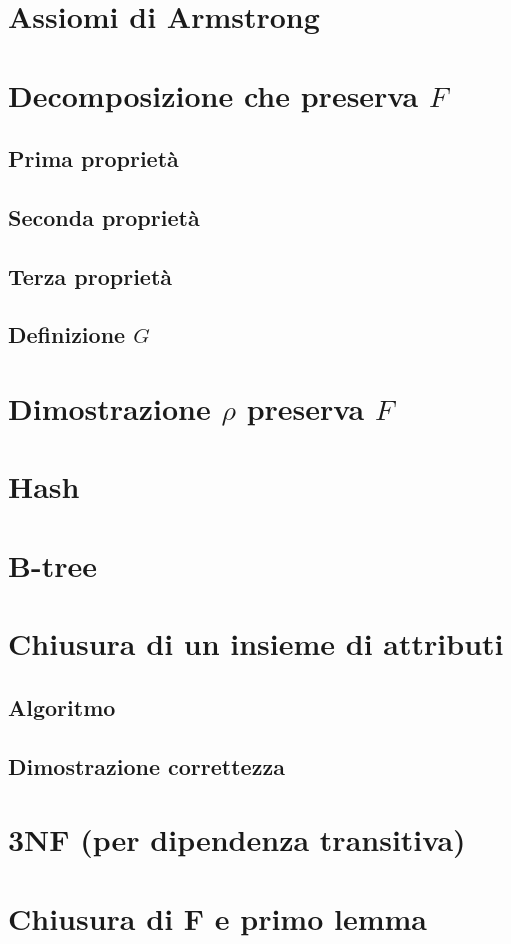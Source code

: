 \documentclass{article}
\begin{document}
\pagebreak
\section{Assiomi di Armstrong}
\pagebreak
\section{Decomposizione che preserva $F$}
\subsection{Prima proprietà}
\subsection{Seconda proprietà}
\subsection{Terza proprietà}
\subsection{Definizione $G$}
\pagebreak
\section{Dimostrazione $\rho$ preserva $F$}
\pagebreak
\section{Hash}
\pagebreak
\section{B-tree}
\pagebreak
\section{Chiusura di un insieme di attributi}
\subsection{Algoritmo}
\subsection{Dimostrazione correttezza}
\pagebreak
\section{3NF (per dipendenza transitiva)}
\pagebreak
\section{Chiusura di F e primo lemma}
\pagebreak
\end{document}
